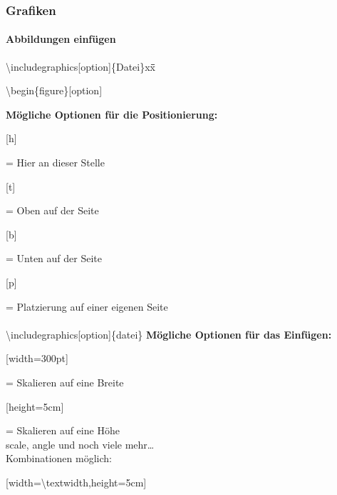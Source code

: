 \begin{frame}
\frametitle{Grafiken}
\framesubtitle{Abbildungen einfügen}
\begin{tabbing}
\textbackslash includegraphics[option]\{Datei\}xx\=\=\=\kill
\begin{ttfamily}
\color{unibablueI}\textbackslash begin\color{black}\{figure\}\color{nounibagreenI}[option]\color{black}
\end{ttfamily}
\>\>\textbf{Mögliche Optionen für die Positionierung:}\\
\>\>\begin{ttfamily}\color{nounibagreenI}[h]\color{black}\end{ttfamily} = Hier an dieser Stelle\\
\>\>\begin{ttfamily}\color{nounibagreenI}[t]\color{black}\end{ttfamily} = Oben auf der Seite\\
\>\>\begin{ttfamily}\color{nounibagreenI}[b]\color{black}\end{ttfamily} = Unten auf der Seite\\
\>\>\begin{ttfamily}\color{nounibagreenI}[p]\color{black}\end{ttfamily} = Platzierung auf einer eigenen
Seite\\[5mm]
~\\[5mm]
\color{nounibaredI}\textbackslash includegraphics\color{nounibagreenI}[option]\color{black}\{datei\}
\>\>\textbf{Mögliche Optionen für das Einfügen:}\\
\>\>\begin{ttfamily}\color{nounibagreenI}[width=300pt]\color{black}\end{ttfamily}= Skalieren auf eine Breite\\
\>\>\begin{ttfamily}\color{nounibagreenI}[height=5cm]\color{black}\end{ttfamily}= Skalieren auf eine Höhe\\
\>\>scale, angle und noch viele mehr\ldots\\
\>\>Kombinationen möglich:\\
\>\>\begin{ttfamily}\color{nounibagreenI}[width=\textbackslash textwidth,height=5cm]\color{black}\end{ttfamily}
\end{tabbing}
\end{frame}

